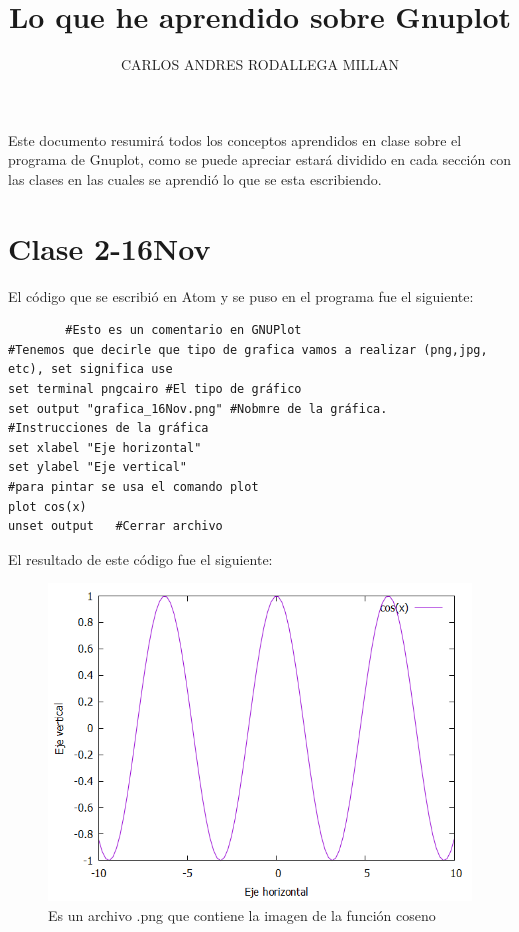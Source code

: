 \documentclass[onecolumn]{article} %
\title{Lo que he aprendido sobre Gnuplot}
\author{CARLOS ANDRES RODALLEGA MILLAN}
\begin{document}
\maketitle %
Este documento resumirá todos los conceptos aprendidos en clase sobre el programa de Gnuplot, como se puede apreciar estará dividido en cada sección con las clases en las cuales se aprendió lo que se esta escribiendo.

\section{Clase 2-16Nov}
El código que se escribió en Atom y se puso en el programa fue el siguiente:
\begin{verbatim}
		#Esto es un comentario en GNUPlot
#Tenemos que decirle que tipo de grafica vamos a realizar (png,jpg, etc), set significa use
set terminal pngcairo #El tipo de gráfico
set output "grafica_16Nov.png" #Nobmre de la gráfica.
#Instrucciones de la gráfica
set xlabel "Eje horizontal"
set ylabel "Eje vertical"
#para pintar se usa el comando plot
plot cos(x)
unset output   #Cerrar archivo
	\end{verbatim}
El resultado de este código fue el siguiente:
\begin{figure}[h!]%
	\centering %
	\includegraphics[scale=0.2]{grafica_16Nov.png}
	\caption{\label{fig_cos}Es un archivo .png que contiene la imagen de la función coseno} 
\end{figure}
\end{document}
